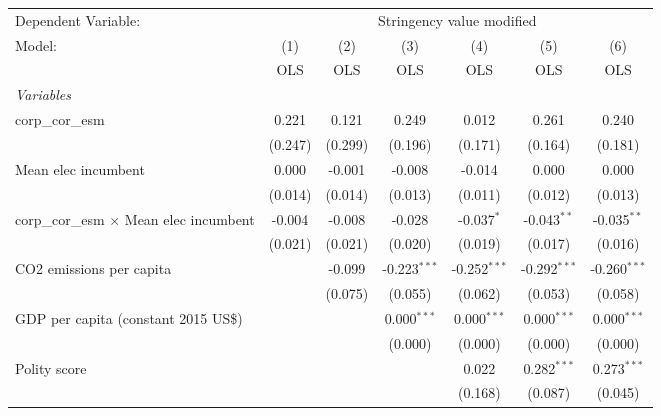 
\begingroup
\centering
\begin{tabular}{lcccccc}
   \toprule
   Dependent Variable: & \multicolumn{6}{c}{Stringency value modified}\\
   Model:                                         & (1)     & (2)     & (3)            & (4)            & (5)            & (6)\\  
                                                  &  OLS    & OLS     & OLS            & OLS            & OLS            & OLS\\  
   \midrule
   \emph{Variables}\\
   corp\_cor\_esm                                 & 0.221   & 0.121   & 0.249          & 0.012          & 0.261          & 0.240\\   
                                                  & (0.247) & (0.299) & (0.196)        & (0.171)        & (0.164)        & (0.181)\\   
   Mean elec incumbent                            & 0.000   & -0.001  & -0.008         & -0.014         & 0.000          & 0.000\\   
                                                  & (0.014) & (0.014) & (0.013)        & (0.011)        & (0.012)        & (0.013)\\   
   corp\_cor\_esm $\times$ Mean elec incumbent    & -0.004  & -0.008  & -0.028         & -0.037$^{*}$   & -0.043$^{**}$  & -0.035$^{**}$\\   
                                                  & (0.021) & (0.021) & (0.020)        & (0.019)        & (0.017)        & (0.016)\\   
   CO2 emissions per capita                       &         & -0.099  & -0.223$^{***}$ & -0.252$^{***}$ & -0.292$^{***}$ & -0.260$^{***}$\\   
                                                  &         & (0.075) & (0.055)        & (0.062)        & (0.053)        & (0.058)\\   
   GDP per capita (constant 2015 US\$)            &         &         & 0.000$^{***}$  & 0.000$^{***}$  & 0.000$^{***}$  & 0.000$^{***}$\\   
                                                  &         &         & (0.000)        & (0.000)        & (0.000)        & (0.000)\\   
   Polity score                                   &         &         &                & 0.022          & 0.282$^{***}$  & 0.273$^{***}$\\   
                                                  &         &         &                & (0.168)        & (0.087)        & (0.045)\\   

\end{tabular}
